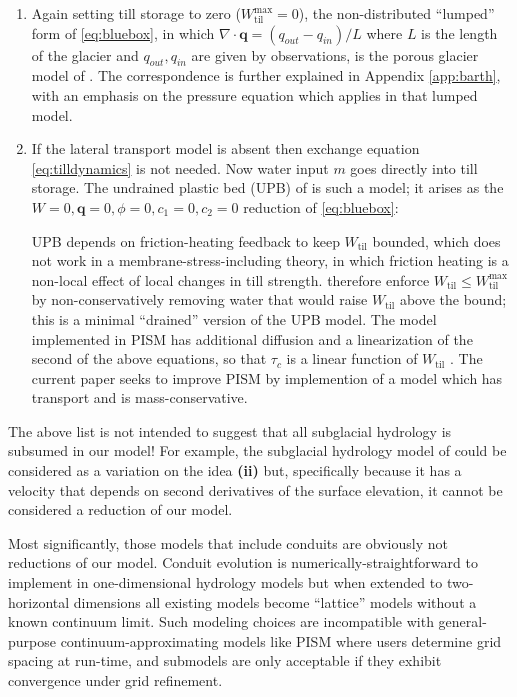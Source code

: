 \documentclass[11pt,final]{amsart}
\newcommand*\mybluebox[1]{%
\colorbox{myblue}{\hspace{1em}#1\hspace{1em}}}
\newcommand\bq{\mathbf{q}}
\newcommand{\ddt}[1]{\ensuremath{\frac{\partial #1}{\partial t}}}
\newcommand{\Div}{\nabla\cdot}
\newcommand{\Wtil}{W_{\text{til}}}
\newcommand{\Wtilmax}{W_{\text{til}}^{\text{max}}}
\begin{document}
\begin{enumerate}
\item Again setting till storage to zero ($\Wtilmax=0$), the non-distributed ``lumped'' form of \eqref{eq:bluebox}, in which $\Div \bq = (q_{out} - q_{in})/L$ where $L$ is the length of the glacier and $q_{out},q_{in}$ are given by observations, is the porous glacier model of \cite{Bartholomausetal2011}.  The correspondence is further explained in Appendix \ref{app:barth}, with an emphasis on the pressure equation which applies in that lumped model.

\item If the lateral transport model is absent then exchange equation \eqref{eq:tilldynamics} is not needed.  Now water input $m$ goes directly into till storage.  The undrained plastic bed (UPB) of \cite{Tulaczyketal2000b} is such a model; it arises as the $W=0,\bq=0,\phi=0,c_1=0,c_2=0$ reduction of \eqref{eq:bluebox}:
UPB depends on friction-heating feedback to keep $\Wtil$ bounded, which does not work in a membrane-stress-including theory, in which friction heating is a non-local effect of local changes in till strength.  \cite{BBssasliding} therefore enforce $\Wtil \le \Wtilmax$ by non-conservatively removing water that would raise $\Wtil$ above the bound; this is a minimal ``drained'' version of the UPB model.  The model implemented in PISM has additional diffusion and a linearization of the second of the above equations, so that $\tau_c$ is a linear function of $\Wtil$ \citep{BBssasliding}.  The current paper seeks to improve PISM by implemention of a model which has transport and is mass-conservative.
\end{enumerate}

The above list is not intended to suggest that all subglacial hydrology is subsumed in our model!  For example, the subglacial hydrology model of \cite{JohnsonFastook} could be considered as a variation on the idea \textbf{(ii)} but, specifically because it has a velocity that depends on second derivatives of the surface elevation, it cannot be considered a reduction of our model.

Most significantly, those models that include conduits \citep[among others]{Hewittetal2012,PimentelFlowers2011,Schoofmeltsupply} are obviously not reductions of our model.  Conduit evolution is numerically-straightforward to implement in one-dimensional hydrology models \citep{Hewittetal2012,PimentelFlowers2011,vanderWeletal2013} but when extended to two-horizontal dimensions all existing models \citep[specifically]{Hewitt2013,Schoofmeltsupply} become ``lattice'' models without a known continuum limit.  Such modeling choices are incompatible with general-purpose continuum-approximating models like PISM where users determine grid spacing at run-time, and submodels are only acceptable if they exhibit convergence under grid refinement.
\end{document}
